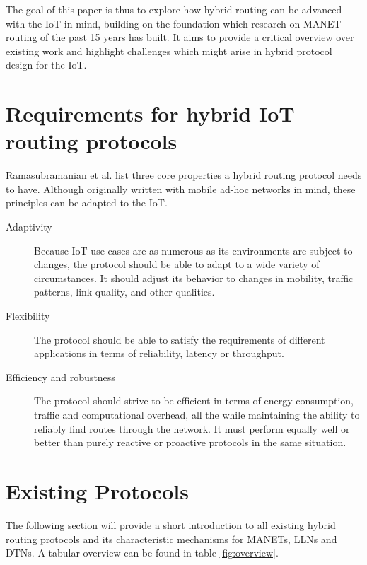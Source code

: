 \documentclass[a4paper,10pt]{scrartcl}
\begin{document}
The goal of this paper is thus to explore how hybrid routing can be advanced with the \gls{IoT} in mind, building on the foundation which research on \gls{MANET} routing of the past 15 years has built. It aims to provide a critical overview over existing work and highlight challenges which might arise in hybrid protocol design for the IoT.\\

\section{Requirements for hybrid IoT routing protocols}
\label{subsec:requirements}
Ramasubramanian et al. \cite{SHARP} list three core properties a hybrid routing protocol needs to have. Although originally written with mobile ad-hoc networks in mind, these principles can be adapted to the IoT.
\begin{description}
\item[Adaptivity] Because IoT use cases are as numerous as its environments are subject to changes, the protocol should be able to adapt to a wide variety of circumstances. It should adjust its behavior to changes in mobility, traffic patterns, link quality, and other qualities.
\item[Flexibility] The protocol should be able to satisfy the requirements of different applications in terms of reliability, latency or throughput.
\item[Efficiency and robustness] The protocol should strive to be efficient in terms of energy consumption, traffic and computational overhead, all the while maintaining the ability to reliably find routes through the network. It must perform equally well or better than purely reactive or proactive protocols in the same situation.
\end{description}

\section{Existing Protocols}
\label{sec:existing_protocols}
The following section will provide a short introduction to all existing hybrid routing protocols and its characteristic mechanisms for \glspl{MANET}, \glspl{LLN} and \glspl{DTN}. A tabular overview can be found in table \ref{fig:overview}.
\end{document}
